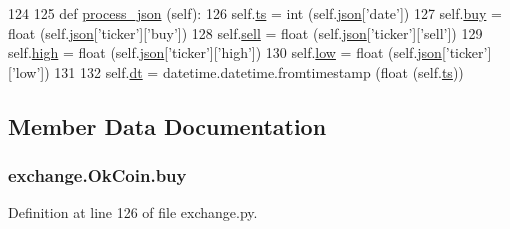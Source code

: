 \begin{DoxyCode}
124 
125     \textcolor{keyword}{def }\hyperlink{classexchange_1_1_ok_coin_accf1d2bd5080a096f37fe64282acf915}{process\_json} (self):
126         self.\hyperlink{classexchange_1_1_ok_coin_a0fe6263a7f58a6fa8a688929976b7e4a}{ts}   = int   (self.\hyperlink{classexchange_1_1_exchange_a6ce8e0779d98031b1cd9200d2a0fa5ad}{json}[\textcolor{stringliteral}{'date'}])
127         self.\hyperlink{classexchange_1_1_ok_coin_aaf828e37142a83cbfb12d193313f6d43}{buy}  = float (self.\hyperlink{classexchange_1_1_exchange_a6ce8e0779d98031b1cd9200d2a0fa5ad}{json}[\textcolor{stringliteral}{'ticker'}][\textcolor{stringliteral}{'buy'}])
128         self.\hyperlink{classexchange_1_1_ok_coin_aadb487d2e2f277374a747e1bcb0bd40b}{sell} = float (self.\hyperlink{classexchange_1_1_exchange_a6ce8e0779d98031b1cd9200d2a0fa5ad}{json}[\textcolor{stringliteral}{'ticker'}][\textcolor{stringliteral}{'sell'}])
129         self.\hyperlink{classexchange_1_1_ok_coin_af9d9dbcfc86404510e7f9a5704e8eecd}{high} = float (self.\hyperlink{classexchange_1_1_exchange_a6ce8e0779d98031b1cd9200d2a0fa5ad}{json}[\textcolor{stringliteral}{'ticker'}][\textcolor{stringliteral}{'high'}])
130         self.\hyperlink{classexchange_1_1_ok_coin_a1afa53e0ad63830d0585288abea42094}{low}  = float (self.\hyperlink{classexchange_1_1_exchange_a6ce8e0779d98031b1cd9200d2a0fa5ad}{json}[\textcolor{stringliteral}{'ticker'}][\textcolor{stringliteral}{'low'}])
131     
132         self.\hyperlink{classexchange_1_1_ok_coin_ade9d7cddcfa54f2b1ba5452854bfd48b}{dt} = datetime.datetime.fromtimestamp (float (self.\hyperlink{classexchange_1_1_ok_coin_a0fe6263a7f58a6fa8a688929976b7e4a}{ts}))
    
\end{DoxyCode}


\subsection{Member Data Documentation}
\hypertarget{classexchange_1_1_ok_coin_aaf828e37142a83cbfb12d193313f6d43}{
\subsubsection[{buy}]{\setlength{\rightskip}{0pt plus 5cm}exchange.\-Ok\-Coin.\-buy}}\label{classexchange_1_1_ok_coin_aaf828e37142a83cbfb12d193313f6d43}


Definition at line 126 of file exchange.\-py.



